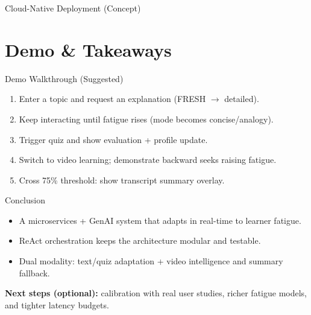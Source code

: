 \documentclass{sdqbeamer}
\begin{document}
\begin{frame}{Cloud-Native Deployment (Concept)}
\centering
{}
\end{frame}

\section{Demo \& Takeaways}

\begin{frame}{Demo Walkthrough (Suggested)}
\begin{enumerate}
  \item Enter a topic and request an explanation (FRESH $\rightarrow$ detailed).
  \item Keep interacting until fatigue rises (mode becomes concise/analogy).
  \item Trigger quiz and show evaluation + profile update.
  \item Switch to video learning; demonstrate backward seeks raising fatigue.
  \item Cross 75\% threshold: show transcript summary overlay.
\end{enumerate}
\end{frame}

\begin{frame}{Conclusion}
\begin{itemize}
  \item A microservices + GenAI system that adapts in real-time to learner fatigue.
  \item ReAct orchestration keeps the architecture modular and testable.
  \item Dual modality: text/quiz adaptation + video intelligence and summary fallback.
\end{itemize}
\vspace{2mm}
\textbf{Next steps (optional):} calibration with real user studies, richer fatigue models, and tighter latency budgets.
\end{frame}
\end{document}
